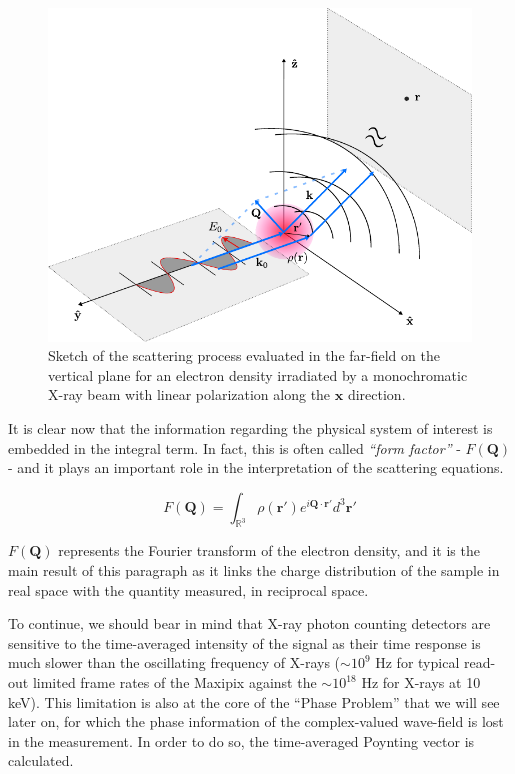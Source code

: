 \begin{figure}[H]
    \centering
    \includegraphics[width=\textwidth]{figures/Intro/scattering.pdf}
    \caption{Sketch of the scattering process evaluated in the far-field on the vertical plane for an electron density irradiated by a monochromatic X-ray beam 
    with linear polarization along the $\mathbf{\hat{x}}$ direction.}
    \label{fig:scattering}
\end{figure}

It is clear now that the information regarding the physical system of interest is embedded in the integral term. 
In fact, this is often called \textit{``form factor''} - $F(\mathbf Q)$ - and it plays an important role in the interpretation of the 
scattering equations. 

\begin{equation}
     F(\mathbf Q) = 
    \int_{\mathbb{R}^3} \rho(\mathbf r') e^{i \mathbf{Q} \cdot \mathbf{r}'}  d^3 \mathbf r'
    \label{eq:formfactor}
\end{equation}

$F(\mathbf{Q})$ represents the Fourier transform of the electron density, and it is the main result of this paragraph as it 
links the charge distribution of the sample in real space with the quantity measured, in reciprocal space. 

To continue, we should bear in mind that X-ray photon counting detectors are sensitive to the time-averaged intensity 
of the signal as their time response is much slower than the oscillating frequency of X-rays ($\sim 10^{9}$ Hz for typical 
read-out limited frame rates of the Maxipix 
\cite{ponchut_maxipix_2011} against the $\sim 10^{18}$ Hz for X-rays at 10 keV). This limitation is also at the core of 
the ``Phase Problem'' that we will see later on, for which the phase information of the complex-valued wave-field is 
lost in the measurement. 
In order to do so, the time-averaged Poynting vector is calculated. 

